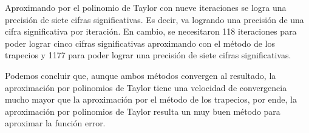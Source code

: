 \documentclass[titlepage,a4paper]{article}
\begin{document}
\begin{enumerate}[label=(\alph*)]
			Aproximando por el polinomio de Taylor con nueve iteraciones se logra una precisión de siete cifras significativas. 
			Es decir, va logrando una precisión de una cifra significativa por iteración. En cambio, 
			se necesitaron 118 iteraciones para poder lograr cinco cifras significativas aproximando con el método de los trapecios y 
			1177 para poder lograr una precisión de siete cifras significativas. 

			Podemos concluir que, aunque ambos métodos convergen al resultado, la aproximación por polinomios de Taylor 
			tiene una velocidad de convergencia mucho mayor que la aproximación por el método de los trapecios, por ende, 
			la aproximación por polinomios de Taylor resulta un muy buen método para aproximar la función error.
	\end{enumerate}
\end{document}
